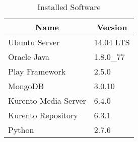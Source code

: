 	\begin{table}[!htb]
\centering
\caption{Installed Software}
\label{table:softspecs}
\begin{tabular}{|l|l|}
\hline
\multicolumn{1}{|c|}{\textbf{Name}} & \multicolumn{1}{c|}{\textbf{Version}}         \\ \hline
Ubuntu Server\footnotemark & 14.04 LTS   \\ \hline
Oracle Java & 1.8.0\_77   \\ \hline
Play Framework & 2.5.0  \\ \hline
MongoDB & 3.0.10   \\ \hline
Kurento Media Server & 6.4.0 \\ \hline
Kurento Repository & 6.3.1 \\ \hline
Python & 2.7.6 \\ \hline
\end{tabular}
\end{table}



